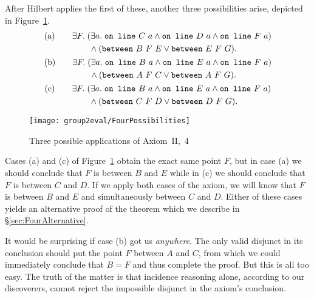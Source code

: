 After Hilbert applies the first of these, another three possibilities arise, depicted in Figure~\ref{fig:FourPossibilities}.
\begin{gather*}
\begin{split}\text{(a)}\qquad
&\exists F.\; (\exists a.\; \code{on\ line}\ C\ a \wedge \code{on\ line}\ D\ a \wedge \code{on\ line}\ F\ a)\\
&\qquad \wedge (\between{B}{F}{E} \vee \between{E}{F}{G}).
\end{split}\\
\begin{split}\text{(b)}\qquad
&\exists F.\;(\exists a.\; \code{on\ line}\ B\ a \wedge \code{on\ line}\ E\ a \wedge \code{on\ line}\ F\ a)\\
&\qquad \wedge (\between{A}{F}{C} \vee \between{A}{F}{G}).
\end{split}\\
\begin{split}\text{(c)}\qquad
&\exists F.\;(\exists a.\; \code{on\ line}\ B\ a \wedge \code{on\ line}\ E\ a \wedge \code{on\ line}\ F\ a)\\
&\qquad \wedge (\between{C}{F}{D} \vee \between{D}{F}{G}).
\end{split}
\end{gather*}

\begin{figure}
  \texttt{[image: group2eval/FourPossibilities]}
  \caption{Three possible applications of Axiom~II,~4}
  \label{fig:FourPossibilities}
\end{figure}

Cases (a) and (c) of Figure~\ref{fig:FourPossibilities} obtain the exact same point $F$, but in case (a) we should conclude that $F$ is between $B$ and $E$ while in (c) we should conclude that $F$ is between $C$ and $D$. If we apply both cases of the axiom, we will know that $F$ is between $B$ and $E$ and simultaneously between $C$ and $D$. Either of these cases yields an alternative proof of the theorem which we describe in \S\ref{sec:FourAlternative}.

It would be surprising if case (b) got us \emph{anywhere}. The only valid disjunct in its conclusion should put the point $F$ between $A$ and $C$, from which we could immediately conclude that $B = F$ and thus complete the proof. But this is all too easy. The truth of the matter is that incidence reasoning alone, according to our discoverers, cannot reject the impossible disjunct in the axiom's conclusion.

